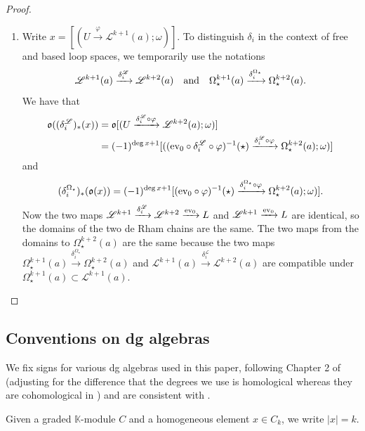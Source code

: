 \documentclass[10pt]{amsart}
\numberwithin{equation}{section}
\theoremstyle{plain}
\theoremstyle{definition}
\theoremstyle{remark}
\numberwithin{equation}{section}
\newcommand{\K}{\mathbb{K}}
\newcommand{\ev}{\textup{ev}}
\begin{document}
{\begin{proof}
\begin{enumerate}
\begin{align*}
		\end{align*}
		\item Write $x=[(U\xrightarrow{\varphi} \mathscr{L}^{k+1}(a);\omega)]$. To distinguish $\delta_i$ in the context of free and based loop spaces, we temporarily use the notations \[ \mathscr{L}^{k+1}(a)\xrightarrow{\delta_i^\mathscr{L}} \mathscr{L}^{k+2}(a) \quad \textup{and}\quad \Omega_\star^{k+1}(a) \xrightarrow{\delta_i^{\Omega_\star}} \Omega_\star^{k+2}(a). \] 
		We have that \begin{align*}
			\mathfrak{o}((\delta^\mathscr{L}_i)_*(x)) &= \mathfrak{o}[(U\xrightarrow{\delta^\mathscr{L}_i\circ\varphi} \mathscr{L}^{k+2}(a);\omega)]\\
			&= (-1)^{\deg x+1} [((\ev_0\circ \delta^\mathscr{L}_i \circ \varphi)^{-1}(\star) \xrightarrow{\delta^\mathscr{L}_i\circ \varphi} \Omega_\star^{k+2}(a);\omega)]
		\end{align*}
		and 
		\begin{align*}
			(\delta^{\Omega_\star}_i)_*(\mathfrak{o}(x)) = (-1)^{\deg x+1}[(\ev_0\circ \varphi)^{-1}(\star) \xrightarrow{ \delta^{\Omega_\star}_i\circ\varphi}\Omega_\star^{k+2}(a);\omega)].
		\end{align*}
		Now the two maps $\mathscr{L}^{k+1}\xrightarrow{\delta^{\mathscr{L}}_i} \mathscr{L}^{k+2} \xrightarrow{\ev_0} L$ and $\mathscr{L}^{k+1}\xrightarrow{\ev_0} L$ are identical, so the domains of the two de Rham chains are the same. The two maps from the domains to $\Omega_\star^{k+2}(a)$ are the same because the two maps $\Omega_\star^{k+1}(a)\xrightarrow{\delta_i^{\Omega_\star}} \Omega_\star^{k+2}(a)$ and $\mathscr{L}^{k+1}(a)\xrightarrow{\delta_i^\mathscr{L}}\mathscr{L}^{k+2}(a)$ are compatible under $\Omega_\star^{k+1}(a)\subset \mathscr{L}^{k+1}(a)$.
	\end{enumerate}
\end{proof}



\subsection{Conventions on dg algebras}\label{Subsc: ConventionDGalg}
We fix signs for various dg algebras used in this paper, following Chapter 2 of \cite{FukayaDefo} (adjusting for the difference that the degrees we use is homological whereas they are cohomological in \cite{FukayaDefo}) and are consistent with \cite{Irie2}.

Given a graded $\K$-module $C$ and a homogeneous element $x\in C_k$, we write $|x|=k$. 


}
\end{document}
